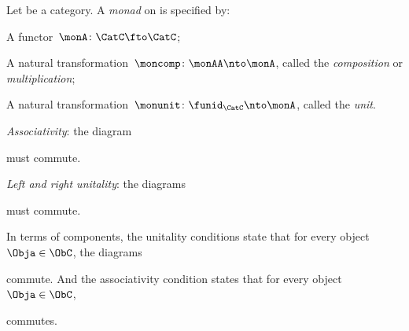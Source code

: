 \begin{ctdefinition}[Monad]
    \label{def:monad}
    Let \CatC be a category. A \emph{monad} on \CatC is specified by:\\
    \constit
    \begin{compactenum}
        \item A functor~$ \monA \colon \CatC \fto \CatC$;
        \item A natural transformation~$\moncomp \colon \monAA \nto \monA$, called the \emph{composition} or \emph{multiplication};
        \item A natural transformation~$\monunit \colon \funid_\CatC \nto \monA$, called the \emph{unit}.
    \end{compactenum}
    \condit
    \begin{compactenum}
        \item \emph{Associativity}: the diagram
        \begin{center}
            \label{eq:monad-associativity}
        \end{center}
        must commute.
        \item \emph{Left and right unitality}: the diagrams
        \begin{center}
            \label{eq:monad-unitality}
        \end{center}
        must commute.
    \end{compactenum}
\end{ctdefinition}

\begin{remark}
    \label{rem:monad-condition-components}
    In terms of components, the unitality conditions state that for every object~$\Obja \in \ObC$, the diagrams

    \begin{center}
    \end{center}


    commute. And the associativity condition states that for every object~$\Obja \in \ObC$,

    \begin{center}
    \end{center}

    commutes.
\end{remark}




